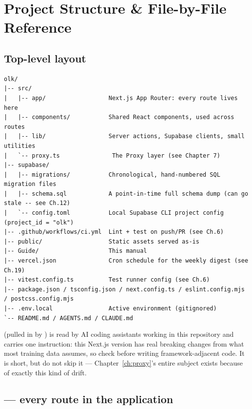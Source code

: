 \chapter{Project Structure \& File-by-File Reference}
\label{ch:project-structure}

\section{Top-level layout}

\begin{lstlisting}[style=olkcodetree, caption={Repository root (trimmed of build artefacts, node\_modules, and dotfiles)}]
olk/
|-- src/
|   |-- app/                  Next.js App Router: every route lives here
|   |-- components/           Shared React components, used across routes
|   |-- lib/                  Server actions, Supabase clients, small utilities
|   `-- proxy.ts               The Proxy layer (see Chapter 7)
|-- supabase/
|   |-- migrations/           Chronological, hand-numbered SQL migration files
|   |-- schema.sql            A point-in-time full schema dump (can go stale -- see Ch.12)
|   `-- config.toml           Local Supabase CLI project config (project_id = "olk")
|-- .github/workflows/ci.yml  Lint + test on push/PR (see Ch.6)
|-- public/                   Static assets served as-is
|-- Guide/                    This manual
|-- vercel.json               Cron schedule for the weekly digest (see Ch.19)
|-- vitest.config.ts          Test runner config (see Ch.6)
|-- package.json / tsconfig.json / next.config.ts / eslint.config.mjs / postcss.config.mjs
|-- .env.local                Active environment (gitignored)
`-- README.md / AGENTS.md / CLAUDE.md
\end{lstlisting}

\begin{olknote}
 (pulled in by ) is read by AI coding assistants working in this repository and carries one instruction: this Next.js version has real breaking changes from what most training data assumes, so check  before writing framework-adjacent code. It is short, but do not skip it — Chapter~\ref{ch:proxy}'s entire subject exists because of exactly this kind of drift.
\end{olknote}

\section{ — every route in the application}

